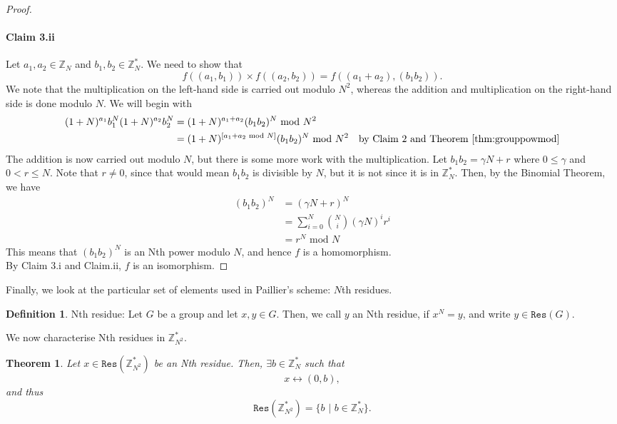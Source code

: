 \documentclass{article}
\newtheorem{theorem}{Theorem}[section]
\theoremstyle{definition}
\newtheorem{definition}{Definition}[section]
\theoremstyle{example}
\newcommand{\Int}{\mathbb{Z}}
\renewcommand{\mod}{\,\,\text{mod}\,\,}
\begin{document}
\begin{proof}
  \paragraph{Claim 3.ii} Let $a_1, a_2 \in \Int_N$ and $b_1, b_2 \in \Int_N^*$. We need to show that
  \[
    f((a_1, b_1)) \times f((a_2, b_2)) = f((a_1 + a_2), (b_1b_2)).
  \]
  We note that the multiplication on the left-hand side is carried out modulo
  $N^2$, whereas the addition and multiplication on the right-hand side is done
  modulo $N$. We will begin with
  \begin{align*}
    (1 + N)^{a_1}b_1^N(1 + N)^{a_2}b_2^N &= (1 + N)^{a_1 + a_2}(b_1b_2)^N \mod N^2 \\
                                         &= (1 + N)^{[a_1 + a_2 \mod N]}(b_1b_2)^N \mod N^2 \quad \text{by Claim 2 and Theorem \ref{thm:grouppowmod}}
  \end{align*}
  The addition is now carried out modulo $N$, but there is some more work with
  the multiplication. Let $b_1b_2 = \gamma N + r$ where $0 \leq \gamma$ and $0 <
  r \leq N$. Note that $r \neq 0$, since that would mean $b_1b_2$ is divisible
  by $N$, but it is not since it is in $\Int_N^*$. Then, by the Binomial
  Theorem, we have
  \begin{align*}
    (b_1b_2)^N &= (\gamma N + r)^N \\
               &= \sum_{i = 0}^N \binom{N}{i}(\gamma N)^ir^i \\
               &= r^N \mod N
  \end{align*}
  This means that $(b_1b_2)^N$ is an Nth power modulo $N$, and hence $f$ is a
  homomorphism. \\
  By Claim 3.i and Claim.ii, $f$ is an isomorphism.
\end{proof}
Finally, we look at the particular set of elements used in Paillier's scheme:
$N$th residues.
\begin{definition}{Nth residue:} Let $G$ be a group and let $x, y \in G$. Then, we call $y$
  an Nth residue, if $x^N = y$, and write $y \in \texttt{Res}(G)$.
\end{definition}
We now characterise Nth residues in $\Int_{N^2}^*$.
\begin{theorem}
  Let $x \in \texttt{Res}(\Int_{N^2}^*)$ be an Nth residue. Then, $\exists b \in
  \Int_N^*$ such that
  \[
    x \leftrightarrow (0, b),
  \]
  and thus
  \[
    \texttt{Res}(\Int_{N^2}^*) = \{b \,\,|\,\, b \in \Int_N^*\}.
  \]
\end{theorem}
\end{document}
